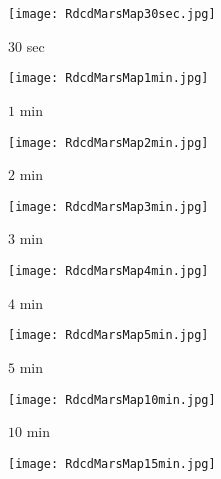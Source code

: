 \begin{figure}[!t]
	\centering
	\begin{subfigure}[t]{0.49\columnwidth}
           	\centering
          	\texttt{[image: RdcdMarsMap30sec.jpg]}
        		\caption{$30$ sec}
		\vspace*{0.025\textwidth}
    	\end{subfigure}
    	\begin{subfigure}[t]{0.49\columnwidth}
           	\centering
          	\texttt{[image: RdcdMarsMap1min.jpg]}
        		\caption{$1$ min}
		\vspace*{0.025\textwidth}
    	\end{subfigure}
	\centering
	\begin{subfigure}[t]{0.49\columnwidth}
           	\centering
          	\texttt{[image: RdcdMarsMap2min.jpg]}
        		\caption{$2$ min}
		\vspace*{0.025\textwidth}
    	\end{subfigure}
    	\begin{subfigure}[t]{0.49\columnwidth}
           	\centering
          	\texttt{[image: RdcdMarsMap3min.jpg]}
        		\caption{$3$ min}
		\vspace*{0.025\textwidth}
    	\end{subfigure}
	\centering
	\begin{subfigure}[t]{0.49\columnwidth}
           	\centering
          	\texttt{[image: RdcdMarsMap4min.jpg]}
        		\caption{$4$ min}
		\vspace*{0.025\textwidth}
    	\end{subfigure}
    	\begin{subfigure}[t]{0.49\columnwidth}
           	\centering
          	\texttt{[image: RdcdMarsMap5min.jpg]}
        		\caption{$5$ min}
		\vspace*{0.025\textwidth}
    	\end{subfigure}
	\centering
	\begin{subfigure}[t]{0.49\columnwidth}
           	\centering
          	\texttt{[image: RdcdMarsMap10min.jpg]}
        		\caption{$10$ min}
		\vspace*{0.025\textwidth}
    	\end{subfigure}
    	\begin{subfigure}[t]{0.49\columnwidth}
           	\centering
          	\texttt{[image: RdcdMarsMap15min.jpg]}

\end{subfigure}
\end{figure}
